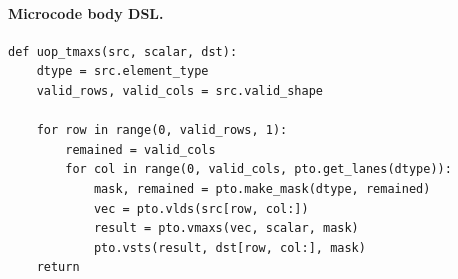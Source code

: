\paragraph{Microcode body DSL.}
\begin{lstlisting}[style=ptocode]
def uop_tmaxs(src, scalar, dst):
    dtype = src.element_type
    valid_rows, valid_cols = src.valid_shape

    for row in range(0, valid_rows, 1):
        remained = valid_cols
        for col in range(0, valid_cols, pto.get_lanes(dtype)):
            mask, remained = pto.make_mask(dtype, remained)
            vec = pto.vlds(src[row, col:])
            result = pto.vmaxs(vec, scalar, mask)
            pto.vsts(result, dst[row, col:], mask)
    return
\end{lstlisting}
\Needspace{0.34\textheight}
